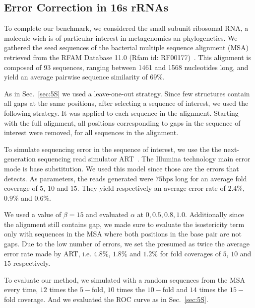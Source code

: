 \subsection{Error Correction in 16s rRNAs}
\label{sec:16S}

To complete our benchmark, we considered the small subunit ribosomal RNA, a molecule wich is of particular interest  in metagenomics an phylogenetics.
We gathered the seed sequences of the bacterial multiple sequence alignment (MSA) retrieved from the RFAM Database 11.0 (Rfam id: RF00177)~\cite{gardner2011rfam}.
This alignment is composed of 93 sequences, ranging between 1461 and 1568 nucleotides long, and yield an average pairwise sequence similarity of $69\%$.

As in Sec.~\ref{sec:5S} we used a leave-one-out strategy. Since few structures contain all gaps 
at the same positions, after selecting a sequence of interest,  we used the following strategy.
 It was applied to each sequence in the alignment. Starting with the full alignment, all positions corresponding to gaps in the sequence of interest were removed, for all sequences in the alignment.  

To simulate sequencing error in the sequence of interest,
 we use the the next-generation sequencing read simulator 
ART~\cite{huang2012art}. The Illumina technology main error mode is base substitution. We used
this model since those
are the errors that \RNApyro detects. As parameters, the reads  generated
were $75\text{bps}$ long for an average fold coverage of $5$, $10$ and $15$. 
 They yield respectively an average error rate of $2.4\%$, $0.9\%$ and $0.6\%$.
 
We used a value of $\beta=15$ and evaluated $\alpha$ at $0, 0.5, 0.8, 1.0$. 
 Additionally since the alignment still contains gap, we made sure to evaluate the isostericity 
 term only
 with sequences in the MSA where both positions in the base pair are not gaps. 
 Due to the low number of errors, we set the presumed as twice the average error rate made by ART, i.e. $4.8\%$, $1.8\%$ and $1.2\%$ for fold coverages of $5$, $10$ and $15$ respectively.

To evaluate our method, we simulated with a random sequences from the MSA every time,
 $12$ times the $5-$fold, $10$ times the $10-$fold and $14$ times the $15-$fold coverage. And we 
 evaluated the ROC curve as in Sec.~\ref{sec:5S}.
 
